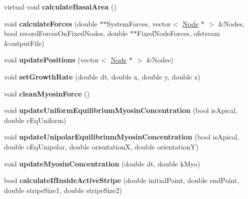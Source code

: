 \begin{DoxyCompactItemize}
\item 
\hypertarget{classShapeBase_a0bc80947335afbc181fca326e9a6b7fb}{}virtual void {\bfseries calculate\+Basal\+Area} ()\label{classShapeBase_a0bc80947335afbc181fca326e9a6b7fb}

\item 
\hypertarget{classShapeBase_a075abfd176f835cf41b581f34682785f}{}void {\bfseries calculate\+Forces} (double $\ast$$\ast$System\+Forces, vector$<$ \hyperlink{classNode}{Node} $\ast$ $>$ \&Nodes, bool record\+Forces\+On\+Fixed\+Nodes, double $\ast$$\ast$Fixed\+Node\+Forces, ofstream \&output\+File)\label{classShapeBase_a075abfd176f835cf41b581f34682785f}

\item 
\hypertarget{classShapeBase_a990c3d93836d53687b8af49a489dbde4}{}void {\bfseries update\+Positions} (vector$<$ \hyperlink{classNode}{Node} $\ast$ $>$ \&Nodes)\label{classShapeBase_a990c3d93836d53687b8af49a489dbde4}

\item 
\hypertarget{classShapeBase_a360757aa3950487361874725c1e5ed9e}{}void {\bfseries set\+Growth\+Rate} (double dt, double x, double y, double z)\label{classShapeBase_a360757aa3950487361874725c1e5ed9e}

\item 
\hypertarget{classShapeBase_aaf8312bb00ea6178abd9ebb1e8f40099}{}void {\bfseries clean\+Myosin\+Force} ()\label{classShapeBase_aaf8312bb00ea6178abd9ebb1e8f40099}

\item 
\hypertarget{classShapeBase_a47ac1da121eea90c265647b6f2115bfe}{}void {\bfseries update\+Uniform\+Equilibrium\+Myosin\+Concentration} (bool is\+Apical, double c\+Eq\+Uniform)\label{classShapeBase_a47ac1da121eea90c265647b6f2115bfe}

\item 
\hypertarget{classShapeBase_a6e4cc22d01118cf2dcb77276b56edf9d}{}void {\bfseries update\+Unipolar\+Equilibrium\+Myosin\+Concentration} (bool is\+Apical, double c\+Eq\+Unipolar, double orientation\+X, double orientation\+Y)\label{classShapeBase_a6e4cc22d01118cf2dcb77276b56edf9d}

\item 
\hypertarget{classShapeBase_ac39db6987b89791e7a0dad1c9f3540f2}{}void {\bfseries update\+Myosin\+Concentration} (double dt, double k\+Myo)\label{classShapeBase_ac39db6987b89791e7a0dad1c9f3540f2}

\item 
\hypertarget{classShapeBase_abfb5933433de7f4f6c58734be0faeac2}{}bool {\bfseries calculate\+If\+Inside\+Active\+Stripe} (double initial\+Point, double end\+Point, double stripe\+Size1, double stripe\+Size2)\label{classShapeBase_abfb5933433de7f4f6c58734be0faeac2}


\end{DoxyCompactItemize}
